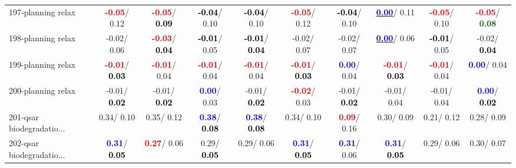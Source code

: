 \begin{table}[h]
\begin{center}
{\begin{tabular}{lc|c|c|c|c|c|c|c|c}
197-planning relax & \textcolor{red}{\textbf{ -0.05}}/  0.12 & \textcolor{red}{\textbf{ -0.05}}/\textcolor{black}{\textbf{  0.09}} & \textcolor{black}{\textbf{ -0.04}}/  0.10 & \textcolor{black}{\textbf{ -0.04}}/  0.10 & \textcolor{red}{\textbf{ -0.05}}/  0.12 & \textcolor{black}{\textbf{ -0.04}}/  0.10 & \underline{\textcolor{blue}{\textbf{  0.00}}}/  0.11 & \textcolor{red}{\textbf{ -0.05}}/  0.10 & \textcolor{red}{\textbf{ -0.05}}/\textcolor{darkgreen}{\textbf{  0.08}} \\
198-planning relax &  -0.02/  0.06 & \textcolor{red}{\textbf{ -0.03}}/\textcolor{black}{\textbf{  0.04}} & \textcolor{black}{\textbf{ -0.01}}/  0.05 & \textcolor{black}{\textbf{ -0.01}}/\textcolor{black}{\textbf{  0.04}} &  -0.02/  0.07 &  -0.02/  0.07 & \underline{\textcolor{blue}{\textbf{  0.00}}}/  0.06 & \textcolor{black}{\textbf{ -0.01}}/  0.05 &  -0.02/\textcolor{black}{\textbf{  0.04}} \\
199-planning relax & \textcolor{red}{\textbf{ -0.01}}/\textcolor{black}{\textbf{  0.03}} & \textcolor{red}{\textbf{ -0.01}}/  0.04 & \textcolor{red}{\textbf{ -0.01}}/  0.04 & \textcolor{red}{\textbf{ -0.01}}/  0.04 & \textcolor{red}{\textbf{ -0.01}}/\textcolor{black}{\textbf{  0.03}} & \textcolor{blue}{\textbf{  0.00}}/  0.04 & \textcolor{red}{\textbf{ -0.01}}/\textcolor{black}{\textbf{  0.03}} & \textcolor{red}{\textbf{ -0.01}}/  0.04 & \textcolor{blue}{\textbf{  0.00}}/  0.04 \\ \hline
200-planning relax &  -0.01/\textcolor{black}{\textbf{  0.02}} &  -0.01/\textcolor{black}{\textbf{  0.02}} & \textcolor{blue}{\textbf{  0.00}}/  0.03 &  -0.01/\textcolor{black}{\textbf{  0.02}} & \textcolor{red}{\textbf{ -0.02}}/  0.03 &  -0.01/\textcolor{black}{\textbf{  0.02}} &  -0.01/  0.04 &  -0.01/  0.04 & \textcolor{blue}{\textbf{  0.00}}/\textcolor{black}{\textbf{  0.02}} \\
201-qsar biodegradatio... &   0.34/  0.10 &   0.35/  0.12 & \textcolor{blue}{\textbf{  0.38}}/\textcolor{black}{\textbf{  0.08}} & \textcolor{blue}{\textbf{  0.38}}/\textcolor{black}{\textbf{  0.08}} &   0.34/  0.10 & \textcolor{red}{\textbf{  0.09}}/  0.16 &   0.30/  0.09 &   0.21/  0.12 &   0.28/  0.09 \\
202-qsar biodegradatio... & \textcolor{blue}{\textbf{  0.31}}/\textcolor{black}{\textbf{  0.05}} & \textcolor{red}{\textbf{  0.27}}/  0.06 &   0.29/\textcolor{black}{\textbf{  0.05}} &   0.29/  0.06 & \textcolor{blue}{\textbf{  0.31}}/\textcolor{black}{\textbf{  0.05}} & \textcolor{blue}{\textbf{  0.31}}/  0.06 & \textcolor{blue}{\textbf{  0.31}}/\textcolor{black}{\textbf{  0.05}} &   0.29/  0.06 &   0.30/  0.07 \\

\end{tabular}}
\end{center}
\end{table}
